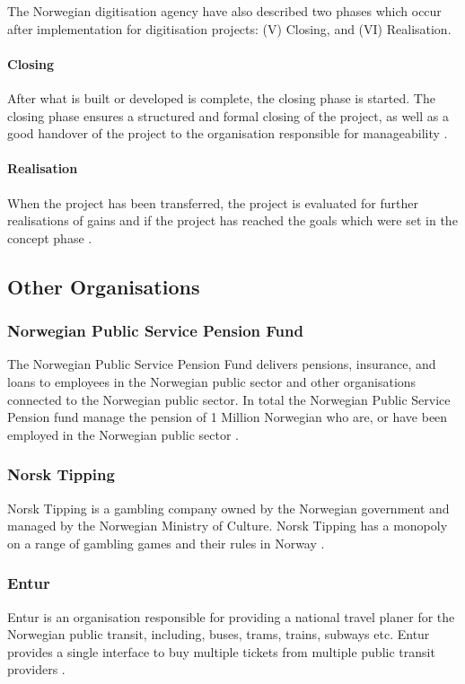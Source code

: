 The Norwegian digitisation agency have also described two phases which occur after implementation for digitisation projects: (V) Closing, and (VI) Realisation.

\paragraph{Closing}
After what is built or developed is complete, the closing phase is started. The closing phase ensures a structured and formal closing of the project, as well as a good handover of the project to the organisation responsible for manageability \cite{project_wizard_digdir_2023}. 

\paragraph{Realisation}
When the project has been transferred, the project is evaluated for further realisations of gains and if the project has reached the goals which were set in the concept phase \cite{project_wizard_digdir_2023}.

\subsection{Other Organisations}
\subsubsection{Norwegian Public Service Pension Fund}
The Norwegian Public Service Pension Fund delivers pensions, insurance, and loans to employees in the Norwegian public sector and other organisations connected to the Norwegian public sector. In total the Norwegian Public Service Pension fund manage the pension of 1 Million Norwegian who are, or have been employed in the Norwegian public sector \cite{statens_pensjonskasse_2023}.

\subsubsection{Norsk Tipping}
Norsk Tipping is a gambling company owned by the Norwegian government and managed by the Norwegian Ministry of Culture. Norsk Tipping has a monopoly on a range of gambling games and their rules in Norway \cite{norsk_tipping_wiki_2023}.

\subsubsection{Entur}
Entur is an organisation responsible for providing a national travel planer for the Norwegian public transit, including, buses, trams, trains, subways etc. Entur provides a single interface to buy multiple tickets from multiple public transit providers \cite{entur_2023}.

